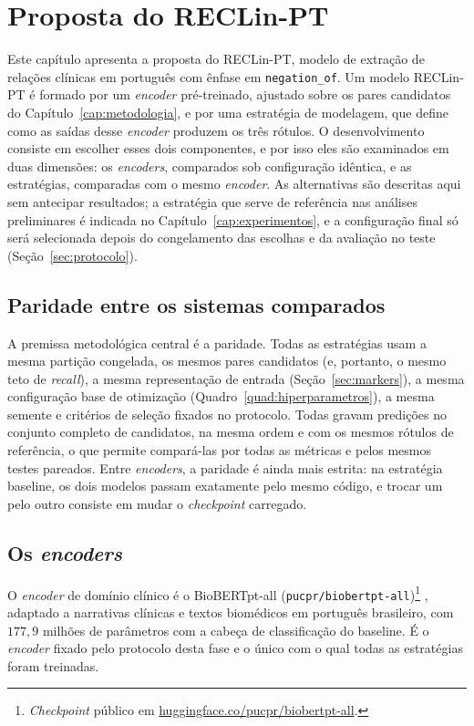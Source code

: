 \chapter[Proposta do RECLin-PT]{Proposta do RECLin-PT}
\label{cap:prototipo}

Este capítulo apresenta a proposta do RECLin-PT, modelo de extração de relações
clínicas em português com ênfase em \texttt{negation\_of}. Um modelo RECLin-PT é
formado por um \emph{encoder} pré-treinado, ajustado sobre os pares candidatos do
Capítulo~\ref{cap:metodologia}, e por uma estratégia de modelagem, que define como
as saídas desse \emph{encoder} produzem os três rótulos. O desenvolvimento consiste
em escolher esses dois componentes, e por isso eles são examinados em duas dimensões:
os \emph{encoders}, comparados sob configuração idêntica, e as estratégias,
comparadas com o mesmo \emph{encoder}. As alternativas são descritas aqui sem
antecipar resultados; a estratégia que serve de referência nas análises preliminares
é indicada no Capítulo~\ref{cap:experimentos}, e a configuração final só será
selecionada depois do congelamento das escolhas e da avaliação no teste
(Seção~\ref{sec:protocolo}).

\section{Paridade entre os sistemas comparados}
\label{sec:visao_baselines}

A premissa metodológica central é a paridade. Todas as estratégias usam a
mesma partição congelada, os mesmos pares candidatos (e, portanto, o mesmo teto de
\emph{recall}), a mesma representação de entrada (Seção~\ref{sec:markers}), a mesma
configuração base de otimização (Quadro~\ref{quad:hiperparametros}), a mesma semente e
critérios de seleção fixados no protocolo. Todas gravam predições no
conjunto completo de candidatos, na mesma ordem e com os mesmos rótulos de
referência, o que permite compará-las por todas as métricas e pelos mesmos testes
pareados. Entre \emph{encoders}, a paridade é ainda mais estrita: na estratégia
baseline, os dois modelos passam exatamente pelo mesmo código, e trocar um pelo
outro consiste em mudar o \emph{checkpoint} carregado.

\section{Os \emph{encoders}}
\label{sec:encoders}

O \emph{encoder} de domínio clínico é o BioBERTpt-all
(\texttt{pucpr/biobertpt-all})\footnote{\emph{Checkpoint} público em
\href{https://huggingface.co/pucpr/biobertpt-all}{huggingface.co/pucpr/biobertpt-all}.}
\cite{schneider_2020_biobertpt}, adaptado a narrativas clínicas e textos
biomédicos em português brasileiro, com $177{,}9$ milhões de parâmetros com a
cabeça de classificação do baseline. É o \emph{encoder} fixado pelo protocolo desta
fase e o único com o qual todas as estratégias foram treinadas.

